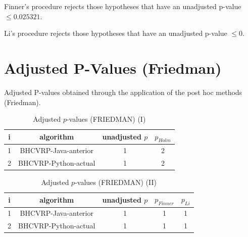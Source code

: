 \documentclass[a4paper,10pt]{article}
\begin{document}
\begin{landscape}
Finner's procedure rejects those hypotheses that have an unadjusted p-value $\le0.025321$.

Li's procedure rejects those hypotheses that have an unadjusted p-value $\le0$.


\newpage

\section{Adjusted P-Values (Friedman)}


Adjusted P-values obtained through the application of the post hoc methods (Friedman).

\begin{table}[!htp]
\centering\small
\begin{tabular}{cccc}
i&algorithm&unadjusted $p$&$p_{Holm}$\\
\hline1&BHCVRP-Java-anterior&1&2\\2&BHCVRP-Python-actual&1&2\\\hline
\end{tabular}
\caption{Adjusted $p$-values (FRIEDMAN) (I)}
\end{table}
\begin{table}[!htp]
\centering\small
\begin{tabular}{ccccc}
i&algorithm&unadjusted $p$&$p_{Finner}$&$p_{Li}$\\
\hline1&BHCVRP-Java-anterior&1&1&1\\2&BHCVRP-Python-actual&1&1&1\\\hline
\end{tabular}
\caption{Adjusted $p$-values (FRIEDMAN) (II)}
\end{table}

\newpage
\end{landscape}
\end{document}
